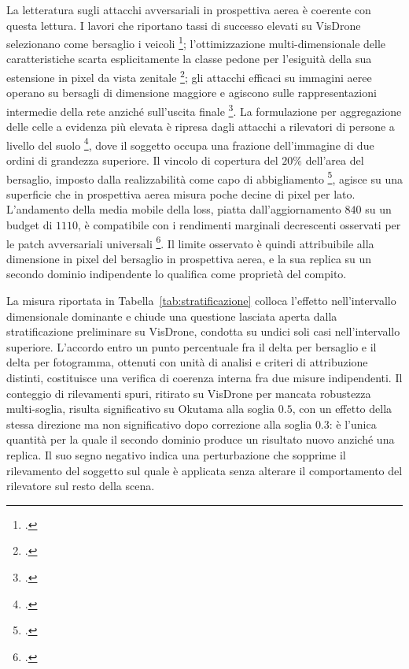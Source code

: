 \documentclass[a4paper,12pt]{report}
\begin{document}
La letteratura sugli attacchi avversariali in prospettiva aerea è coerente con questa lettura. I lavori che riportano tassi di successo elevati su VisDrone selezionano come bersaglio i veicoli \footcite{shrestha_2023}; l'ottimizzazione multi-dimensionale delle caratteristiche scarta esplicitamente la classe pedone per l'esiguità della sua estensione in pixel da vista zenitale \footcite{xi_2025_lfrap}; gli attacchi efficaci su immagini aeree operano su bersagli di dimensione maggiore e agiscono sulle rappresentazioni intermedie della rete anziché sull'uscita finale \footcite{tang_2023}. La formulazione per aggregazione delle celle a evidenza più elevata è ripresa dagli attacchi a rilevatori di persone a livello del suolo \footcite{thys_2019}, dove il soggetto occupa una frazione dell'immagine di due ordini di grandezza superiore. Il vincolo di copertura del $20\%$ dell'area del bersaglio, imposto dalla realizzabilità come capo di abbigliamento \footcite{huang_2020_upc}, agisce su una superficie che in prospettiva aerea misura poche decine di pixel per lato. L'andamento della media mobile della loss, piatta dall'aggiornamento $840$ su un budget di $1110$, è compatibile con i rendimenti marginali decrescenti osservati per le patch avversariali universali \footcite{brown_2017_patch}. Il limite osservato è quindi attribuibile alla dimensione in pixel del bersaglio in prospettiva aerea, e la sua replica su un secondo dominio indipendente lo qualifica come proprietà del compito.

La misura riportata in Tabella~\ref{tab:stratificazione} colloca l'effetto nell'intervallo dimensionale dominante e chiude una questione lasciata aperta dalla stratificazione preliminare su VisDrone, condotta su undici soli casi nell'intervallo superiore. L'accordo entro un punto percentuale fra il delta per bersaglio e il delta per fotogramma, ottenuti con unità di analisi e criteri di attribuzione distinti, costituisce una verifica di coerenza interna fra due misure indipendenti. Il conteggio di rilevamenti spuri, ritirato su VisDrone per mancata robustezza multi-soglia, risulta significativo su Okutama alla soglia $0.5$, con un effetto della stessa direzione ma non significativo dopo correzione alla soglia $0.3$: è l'unica quantità per la quale il secondo dominio produce un risultato nuovo anziché una replica. Il suo segno negativo indica una perturbazione che sopprime il rilevamento del soggetto sul quale è applicata senza alterare il comportamento del rilevatore sul resto della scena.
\end{document}
